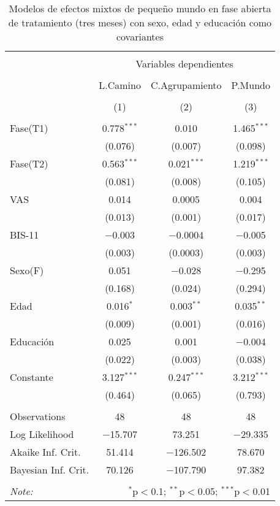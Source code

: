 \begin{table}[!htbp] \centering
  \caption{Modelos de efectos mixtos de pequeño mundo en fase abierta de tratamiento (tres meses) con sexo, edad y educación como covariantes}
  \label{}
\begin{tabular}{@{\extracolsep{5pt}}lccc}
\\[-1.8ex]\hline
\hline \\[-1.8ex]
 & \multicolumn{3}{c}{Variables dependientes} \\
\cline{2-4}
\\[-1.8ex] & L.Camino & C.Agrupamiento & P.Mundo \\
\\[-1.8ex] & (1) & (2) & (3)\\
\hline \\[-1.8ex]
 Fase(T1) & 0.778$^{***}$ & 0.010 & 1.465$^{***}$ \\
  & (0.076) & (0.007) & (0.098) \\
  Fase(T2) & 0.563$^{***}$ & 0.021$^{***}$ & 1.219$^{***}$ \\
  & (0.081) & (0.008) & (0.105) \\
  VAS & 0.014 & 0.0005 & 0.004 \\
  & (0.013) & (0.001) & (0.017) \\
  BIS-11 & $-$0.003 & $-$0.0004 & $-$0.005 \\
  & (0.003) & (0.0003) & (0.003) \\
  Sexo(F) & 0.051 & $-$0.028 & $-$0.295 \\
  & (0.168) & (0.024) & (0.294) \\
  Edad & 0.016$^{*}$ & 0.003$^{**}$ & 0.035$^{**}$ \\
  & (0.009) & (0.001) & (0.016) \\
  Educación & 0.025 & 0.001 & $-$0.004 \\
  & (0.022) & (0.003) & (0.038) \\
  Constante & 3.127$^{***}$ & 0.247$^{***}$ & 3.212$^{***}$ \\
  & (0.464) & (0.065) & (0.793) \\
 \hline \\[-1.8ex]
Observations & 48 & 48 & 48 \\
Log Likelihood & $-$15.707 & 73.251 & $-$29.335 \\
Akaike Inf. Crit. & 51.414 & $-$126.502 & 78.670 \\
Bayesian Inf. Crit. & 70.126 & $-$107.790 & 97.382 \\
\hline
\hline \\[-1.8ex]
\textit{Note:}  & \multicolumn{3}{r}{$^{*}$p$<$0.1; $^{**}$p$<$0.05; $^{***}$p$<$0.01} \\
\end{tabular}
\end{table}



